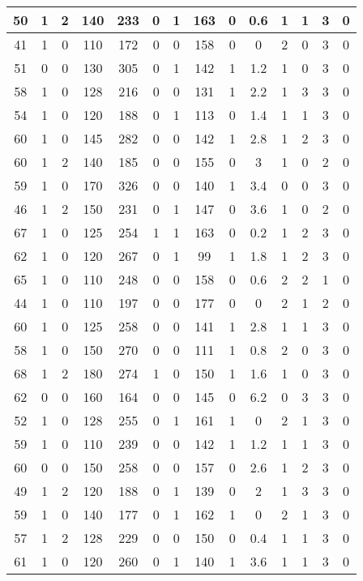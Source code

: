 \documentclass{article}
\begin{document}
\begin{longtable}{|c|c|c|c|c|c|c|c|c|c|c|c|c|c|}
50 & 1 & 2 & 140 & 233 & 0 & 1 & 163 & 0 & 0.6 & 1 & 1 & 3 & 0\\ \hline
41 & 1 & 0 & 110 & 172 & 0 & 0 & 158 & 0 & 0 & 2 & 0 & 3 & 0\\ \hline
51 & 0 & 0 & 130 & 305 & 0 & 1 & 142 & 1 & 1.2 & 1 & 0 & 3 & 0\\ \hline
58 & 1 & 0 & 128 & 216 & 0 & 0 & 131 & 1 & 2.2 & 1 & 3 & 3 & 0\\ \hline
54 & 1 & 0 & 120 & 188 & 0 & 1 & 113 & 0 & 1.4 & 1 & 1 & 3 & 0\\ \hline
60 & 1 & 0 & 145 & 282 & 0 & 0 & 142 & 1 & 2.8 & 1 & 2 & 3 & 0\\ \hline
60 & 1 & 2 & 140 & 185 & 0 & 0 & 155 & 0 & 3 & 1 & 0 & 2 & 0\\ \hline
59 & 1 & 0 & 170 & 326 & 0 & 0 & 140 & 1 & 3.4 & 0 & 0 & 3 & 0\\ \hline
46 & 1 & 2 & 150 & 231 & 0 & 1 & 147 & 0 & 3.6 & 1 & 0 & 2 & 0\\ \hline
67 & 1 & 0 & 125 & 254 & 1 & 1 & 163 & 0 & 0.2 & 1 & 2 & 3 & 0\\ \hline
62 & 1 & 0 & 120 & 267 & 0 & 1 & 99 & 1 & 1.8 & 1 & 2 & 3 & 0\\ \hline
65 & 1 & 0 & 110 & 248 & 0 & 0 & 158 & 0 & 0.6 & 2 & 2 & 1 & 0\\ \hline
44 & 1 & 0 & 110 & 197 & 0 & 0 & 177 & 0 & 0 & 2 & 1 & 2 & 0\\ \hline
60 & 1 & 0 & 125 & 258 & 0 & 0 & 141 & 1 & 2.8 & 1 & 1 & 3 & 0\\ \hline
58 & 1 & 0 & 150 & 270 & 0 & 0 & 111 & 1 & 0.8 & 2 & 0 & 3 & 0\\ \hline
68 & 1 & 2 & 180 & 274 & 1 & 0 & 150 & 1 & 1.6 & 1 & 0 & 3 & 0\\ \hline
62 & 0 & 0 & 160 & 164 & 0 & 0 & 145 & 0 & 6.2 & 0 & 3 & 3 & 0\\ \hline
52 & 1 & 0 & 128 & 255 & 0 & 1 & 161 & 1 & 0 & 2 & 1 & 3 & 0\\ \hline
59 & 1 & 0 & 110 & 239 & 0 & 0 & 142 & 1 & 1.2 & 1 & 1 & 3 & 0\\ \hline
60 & 0 & 0 & 150 & 258 & 0 & 0 & 157 & 0 & 2.6 & 1 & 2 & 3 & 0\\ \hline
49 & 1 & 2 & 120 & 188 & 0 & 1 & 139 & 0 & 2 & 1 & 3 & 3 & 0\\ \hline
59 & 1 & 0 & 140 & 177 & 0 & 1 & 162 & 1 & 0 & 2 & 1 & 3 & 0\\ \hline
57 & 1 & 2 & 128 & 229 & 0 & 0 & 150 & 0 & 0.4 & 1 & 1 & 3 & 0\\ \hline
61 & 1 & 0 & 120 & 260 & 0 & 1 & 140 & 1 & 3.6 & 1 & 1 & 3 & 0\\ \hline

\end{longtable}
\end{document}
